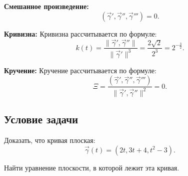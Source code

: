 \documentclass{article}
\begin{document}
        \textbf{Смешанное произведение:}
        \[
        (\vec{\gamma}', \vec{\gamma}'', \vec{\gamma}''') = 0.
        \]
        
        \textbf{Кривизна:}
        Кривизна рассчитывается по формуле:
        \[
        k(t) = \frac{\|\vec{\gamma}' , \vec{\gamma}''\|}{\|\vec{\gamma}'\|^3} = \frac{2\sqrt{2}}{2^3} = 2^{-\frac{3}{2}}.
        \]
        
        \textbf{Кручение:}
        Кручение рассчитывается по формуле:
        \[
        \Xi = \frac{(\vec{\gamma}', \vec{\gamma}'', \vec{\gamma}''')}{\|\vec{\gamma}' , \vec{\gamma}''\|^2} = 0.
        \]
        \subsection*{Условие задачи}
        Доказать, что кривая плоская:
        \[
        \vec{\gamma}(t) = \left(2t, 3t + 4, t^2 - 3\right).
        \]
        
        Найти уравнение плоскости, в которой лежит эта кривая.
            
\end{document}
